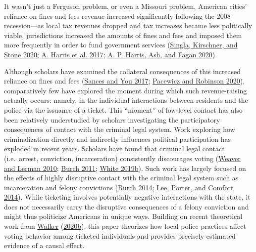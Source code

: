\documentclass[
  12pt,
]{article}
\begin{document}
It wasn't just a Ferguson problem, or even a Missouri problem. American cities' reliance on fines and fees revenue increased significantly following the 2008 recession---as local tax revenues dropped and tax increases became less politically viable, jurisdictions increased the amounts of fines and fees and imposed them more frequently in order to fund government services (\protect\hyperlink{ref-Singla2020}{Singla, Kirschner, and Stone 2020}; \protect\hyperlink{ref-Harris2017}{A. Harris et al. 2017}; \protect\hyperlink{ref-Harris2020}{A. P. Harris, Ash, and Fagan 2020}).

Although scholars have examined the collateral consequences of this increased reliance on fines and fees (\protect\hyperlink{ref-Sances2017}{Sances and You 2017}; \protect\hyperlink{ref-Pacewicz2020}{Pacewicz and Robinson 2020}), comparatively few have explored the moment during which such revenue-raising actually occurs: namely, in the individual interactions between residents and the police via the issuance of a ticket. This ``moment'' of low-level contact has also been relatively understudied by scholars investigating the participatory consequences of contact with the criminal legal system. Work exploring how criminalization directly and indirectly influences political participation has exploded in recent years. Scholars have found that criminal legal contact (i.e.~arrest, conviction, incarceration) consistently discourages voting (\protect\hyperlink{ref-Weaver2010}{Weaver and Lerman 2010}; \protect\hyperlink{ref-Burch2011}{Burch 2011}; \protect\hyperlink{ref-White2019a}{White 2019b}). Such work has largely focused on the effects of highly disruptive contact with the criminal legal system such as incarceration and felony convictions (\protect\hyperlink{ref-Burch2014}{Burch 2014}; \protect\hyperlink{ref-Lee2014}{Lee, Porter, and Comfort 2014}). While ticketing involves potentially negative interactions with the state, it does not necessarily carry the disruptive consequences of a felony conviction and might thus politicize Americans in unique ways. Building on recent theoretical work from \protect\hyperlink{ref-Walker2020a}{Walker} (\protect\hyperlink{ref-Walker2020a}{2020b}), this paper theorizes how local police practices affect voting behavior among ticketed individuals and provides precisely estimated evidence of a causal effect.
\end{document}
